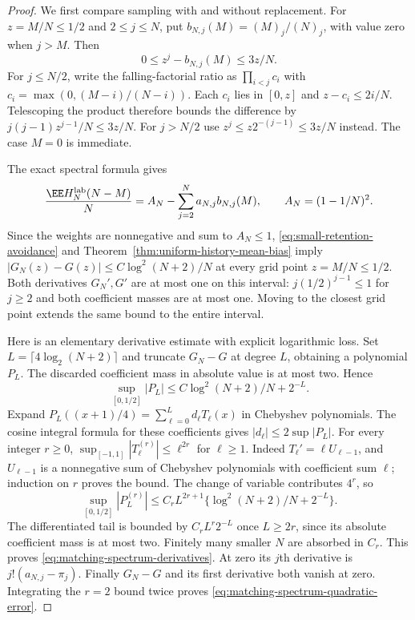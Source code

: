 \documentclass[11pt,letterpaper]{article}
\begin{document}
\begin{proof}
We first compare sampling with and without replacement.
For $z=M/N\le1/2$ and $2\le j\le N$, put
$b_{N,j}(M)=(M)_j/(N)_j$, with value zero when $j>M$.
Then
\begin{equation}\label{eq:small-retention-avoidance}
 0\le z^j-b_{N,j}(M)\le 3z/N.
\end{equation}
For $j\le N/2$, write the falling-factorial ratio as
$\prod_{i<j}c_i$ with $c_i=\max(0,(M-i)/(N-i))$.
Each $c_i$ lies in $[0,z]$ and $z-c_i\le2i/N$.
Telescoping the product therefore bounds the difference by
$j(j-1)z^{j-1}/N\le3z/N$.
For $j>N/2$ use $z^j\le z2^{-(j-1)}\le3z/N$ instead.
The case $M=0$ is immediate.

The exact spectral formula gives
\[
 \frac{\EE H_N^{\rm lab}(N-M)}N
   = A_N-\sum_{j=2}^Na_{N,j}b_{N,j}(M),
 \qquad A_N=(1-1/N)^2.
\]
Since the weights are nonnegative and sum to $A_N\le1$,
\eqref{eq:small-retention-avoidance} and
Theorem~\ref{thm:uniform-history-mean-bias} imply
$|G_N(z)-G(z)|\le C\log^2(N+2)/N$ at every grid point
$z=M/N\le1/2$. Both derivatives $G_N',G'$ are at most one on
this interval: $j(1/2)^{j-1}\le1$ for $j\ge2$ and both
coefficient masses are at most one. Moving to the closest grid
point extends the same bound to the entire interval.

Here is an elementary derivative estimate with explicit logarithmic
loss. Set $L=\lceil4\log_2(N+2)\rceil$ and truncate $G_N-G$ at
degree $L$, obtaining a polynomial $P_L$. The discarded coefficient
mass in absolute value is at most two. Hence
\[
 \sup_{[0,1/2]}|P_L|
       \le C\log^2(N+2)/N+2^{-L}.
\]
Expand $P_L((x+1)/4)=\sum_{\ell=0}^L d_\ell T_\ell(x)$
in Chebyshev polynomials. The cosine integral formula for these
coefficients gives $|d_\ell|\le2\sup|P_L|$.
For every integer $r\ge0$,
$\sup_{[-1,1]}|T_\ell^{(r)}|\le\ell^{2r}$ for $\ell\ge1$.
Indeed $T_\ell'=\ell U_{\ell-1}$, and $U_{\ell-1}$ is a
nonnegative sum of Chebyshev polynomials with coefficient sum
$\ell$; induction on $r$ proves the bound.
The change of variable contributes $4^r$, so
\[
 \sup_{[0,1/2]}|P_L^{(r)}|
       \le C_r L^{2r+1}
                   \{\log^2(N+2)/N+2^{-L}\}.
\]
The differentiated tail is bounded by
$C_r L^r2^{-L}$ once $L\ge2r$, since its absolute coefficient
mass is at most two. Finitely many smaller $N$ are absorbed in
$C_r$. This proves \eqref{eq:matching-spectrum-derivatives}.
At zero its $j$th derivative is $j!(a_{N,j}-\pi_j)$.
Finally $G_N-G$ and its first derivative both vanish at zero.
Integrating the $r=2$ bound twice proves
\eqref{eq:matching-spectrum-quadratic-error}.
\end{proof}
\end{document}
